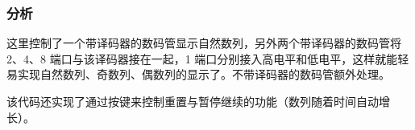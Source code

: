 \documentclass[a4paper]{article}
\begin{document}
        \subsubsection{分析}
            \par 这里控制了一个带译码器的数码管显示自然数列，另外两个带译码器的数码管将 2、4、8 端口与该译码器接在一起，1 端口分别接入高电平和低电平，这样就能轻易实现自然数列、奇数列、偶数列的显示了。不带译码器的数码管额外处理。
            \par 该代码还实现了通过按键来控制重置与暂停继续的功能（数列随着时间自动增长）。
\end{document}
